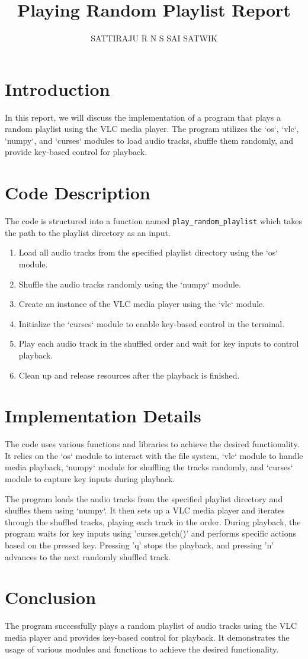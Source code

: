 \documentclass{article}
\begin{document}
\title{Playing Random Playlist Report}
\author{SATTIRAJU R N S SAI SATWIK}
\maketitle

\section{Introduction}
In this report, we will discuss the implementation of a program that plays a random playlist using the VLC media player. The program utilizes the `os`, `vlc`, `numpy`, and `curses` modules to load audio tracks, shuffle them randomly, and provide key-based control for playback.

\section{Code Description}
The code is structured into a function named \texttt{play\_random\_playlist} which takes the path to the playlist directory as an input.

\begin{enumerate}
  \item Load all audio tracks from the specified playlist directory using the `os` module.
  \item Shuffle the audio tracks randomly using the `numpy` module.
  \item Create an instance of the VLC media player using the `vlc` module.
  \item Initialize the `curses` module to enable key-based control in the terminal.
  \item Play each audio track in the shuffled order and wait for key inputs to control playback.
  \item Clean up and release resources after the playback is finished.
\end{enumerate}

\section{Implementation Details}
The code uses various functions and libraries to achieve the desired functionality. It relies on the `os` module to interact with the file system, `vlc` module to handle media playback, `numpy` module for shuffling the tracks randomly, and `curses` module to capture key inputs during playback.

The program loads the audio tracks from the specified playlist directory and shuffles them using `numpy`. It then sets up a VLC media player and iterates through the shuffled tracks, playing each track in the order. During playback, the program waits for key inputs using 'curses.getch()' and performs specific actions based on the pressed key. Pressing 'q' stops the playback, and pressing 'n' advances to the next randomly shuffled track.

\section{Conclusion}
The program successfully plays a random playlist of audio tracks using the VLC media player and provides key-based control for playback. It demonstrates the usage of various modules and functions to achieve the desired functionality.
\end{document}
